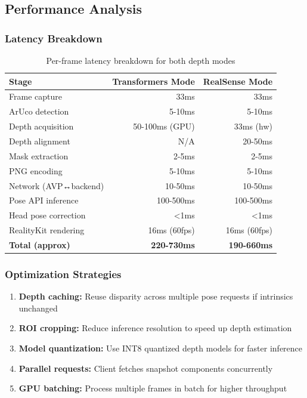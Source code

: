 \subsection{Performance Analysis}

\subsubsection{Latency Breakdown}

\begin{table}[H]
\centering
\begin{tabular}{|l|r|r|}
\hline
\textbf{Stage} & \textbf{Transformers Mode} & \textbf{RealSense Mode} \\
\hline
Frame capture & 33ms & 33ms \\
ArUco detection & 5-10ms & 5-10ms \\
Depth acquisition & 50-100ms (GPU) & 33ms (hw) \\
Depth alignment & N/A & 20-50ms \\
Mask extraction & 2-5ms & 2-5ms \\
PNG encoding & 5-10ms & 5-10ms \\
Network (AVP↔backend) & 10-50ms & 10-50ms \\
Pose API inference & 100-500ms & 100-500ms \\
Head pose correction & <1ms & <1ms \\
RealityKit rendering & 16ms (60fps) & 16ms (60fps) \\
\hline
\textbf{Total (approx)} & \textbf{220-730ms} & \textbf{190-660ms} \\
\hline
\end{tabular}
\caption{Per-frame latency breakdown for both depth modes}
\label{tab:latency}
\end{table}

\subsubsection{Optimization Strategies}

\begin{enumerate}
    \item \textbf{Depth caching:} Reuse disparity across multiple pose requests if intrinsics unchanged
    \item \textbf{ROI cropping:} Reduce inference resolution to speed up depth estimation
    \item \textbf{Model quantization:} Use INT8 quantized depth models for faster inference
    \item \textbf{Parallel requests:} Client fetches snapshot components concurrently
    \item \textbf{GPU batching:} Process multiple frames in batch for higher throughput
\end{enumerate}


